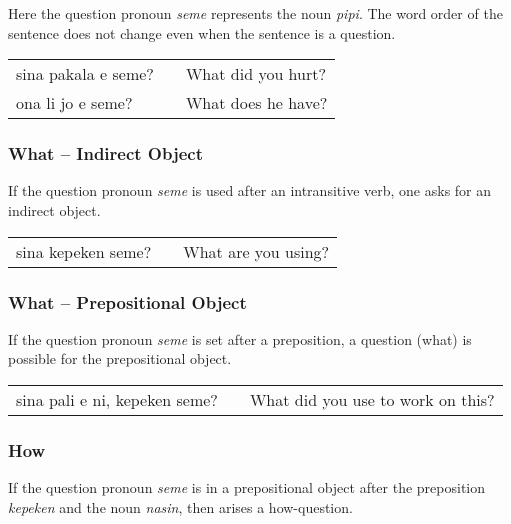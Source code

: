 Here the question pronoun \textit{seme} represents the noun \textit{pipi}.
The word order of the sentence does not change even when the sentence is a question.

\begin{supertabular}{p{5,5cm}|ll}
    sina pakala e seme? &  & What did you hurt? \\
    ona li jo e seme?   &  & What does he have? \\
\end{supertabular}
%
\subsubsection*{What -- Indirect Object}
%

If the question pronoun \textit{seme} is used after an intransitive verb, one asks for an indirect object.

\begin{supertabular}{p{5,5cm}|ll}
    sina kepeken seme? &  & What are you using? \\
\end{supertabular}
%
%
\subsubsection*{What -- Prepositional Object}

%
If the question pronoun \textit{seme} is set after a preposition, a question (what) is possible for the prepositional object. \\

\begin{supertabular}{p{5,5cm}|ll}
    sina pali e ni, kepeken seme? &  & What did you use to work on this? \\
\end{supertabular}

%
\subsubsection*{How}
%
%
If the question pronoun \textit{seme} is in a prepositional object after the preposition \textit{kepeken} and the noun \textit{nasin}, then arises a how-question.

